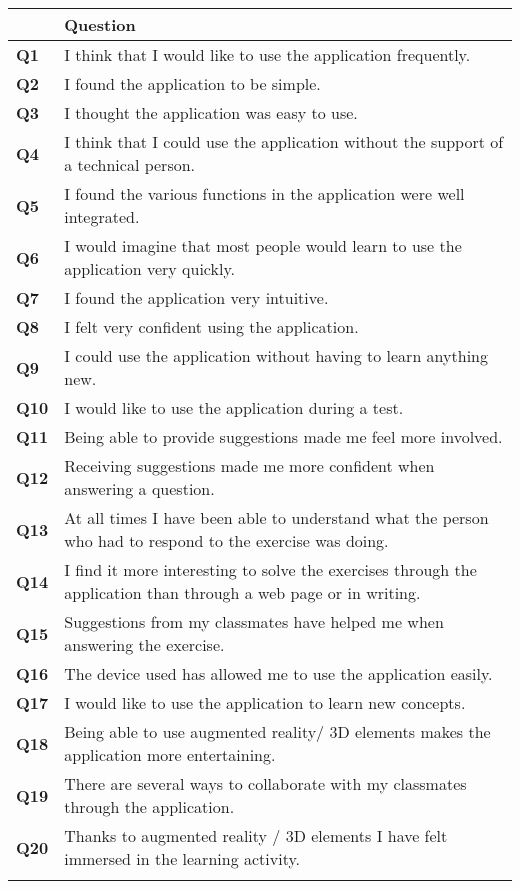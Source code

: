 \begin{table*}[ht]\centering
\begin{tabular}{p{}>{\arraybackslash}p{}}
\toprule
 & Question\\
\midrule
    \textbf{Q1} & I think that I would like to use the application frequently. \\
    \textbf{Q2} & I found the application to be simple. \\
    \textbf{Q3} &I thought the application was easy to use. \\
    \textbf{Q4} & I think that I could use the application without the support of a technical person. \\
    \textbf{Q5} & I found the various functions in the application were well integrated. \\
    \textbf{Q6} & I would imagine that most people would learn to use the application very quickly. \\
    \textbf{Q7} & I found the application very intuitive. \\
    \textbf{Q8} & I felt very confident using the application. \\
    \textbf{Q9} & I could use the application without having to learn anything new. \\
    \textbf{Q10} & I would like to use the application during a test. \\
    \textbf{Q11} & Being able to provide suggestions made me feel more involved. \\
    \textbf{Q12} & Receiving suggestions made me more confident when answering a question. \\
    \textbf{Q13} & At all times I have been able to understand what the person who had to respond to the exercise was doing. \\
    \textbf{Q14} & I find it more interesting to solve the exercises through the application than through a web page or in writing. \\
    \textbf{Q15} & Suggestions from my classmates have helped me when answering the exercise. \\
    \textbf{Q16} & The device used  has allowed me to use the application easily. \\
    \textbf{Q17} & I would like to use the application to learn new concepts. \\
    \textbf{Q18} & Being able to use augmented reality/ 3D elements makes the application more entertaining. \\
    \textbf{Q19} & There are several ways to collaborate with my classmates through the application. \\
    \textbf{Q20} & Thanks to augmented reality / 3D elements I have felt immersed in the learning activity. \\
\bottomrule
\label{tab:studentquestionnaire}
\end{tabular}
\end{table*}

